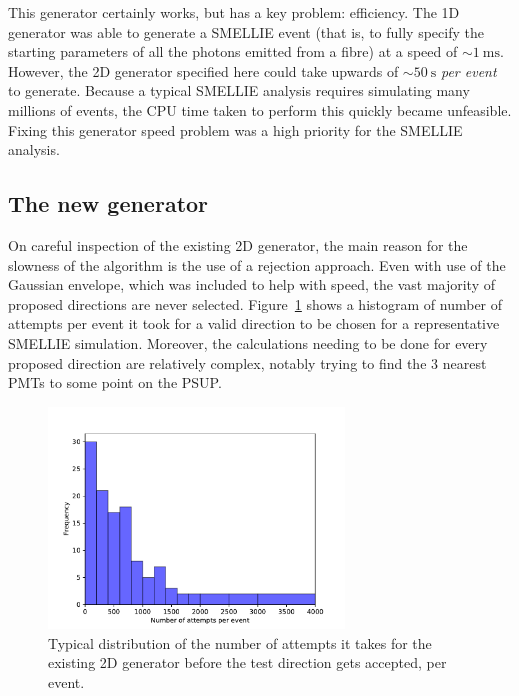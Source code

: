 This generator certainly works, but has a key problem: efficiency. The 1D generator was able to generate a SMELLIE event (that is, to fully specify the starting parameters of all the photons emitted from a fibre) at a speed of $\sim\SI{1}{\milli\second}$. However, the 2D generator specified here could take upwards of $\sim\SI{50}{\second}$ \textit{per event} to generate. Because a typical SMELLIE analysis requires simulating many millions of events, the CPU time taken to perform this quickly became unfeasible. Fixing this generator speed problem was a high priority for the SMELLIE analysis.

\subsection{The new generator}\label{sect:new_gen}
On careful inspection of the existing 2D generator, the main reason for the slowness of the algorithm is the use of a rejection approach. Even with use of the Gaussian envelope, which was included to help with speed, the vast majority of proposed directions are never selected. Figure~\ref{fig:num_attempts} shows a histogram of number of attempts per event it took for a valid direction to be chosen for a representative SMELLIE simulation. Moreover, the calculations needing to be done for every proposed direction are relatively complex, notably trying to find the 3 nearest PMTs to some point on the PSUP.

\begin{figure}
    \centering
    \includegraphics[width=0.7\textwidth]{4_SMELLIESimulation/images/2D_generator_num_attempts_nicer.pdf}
    \caption[Number of attempts taken for existing 2D SMELLIE generator to accept direction]{Typical distribution of the number of attempts it takes for the existing 2D generator before the test direction gets accepted, per event.}
    \label{fig:num_attempts}
\end{figure}


